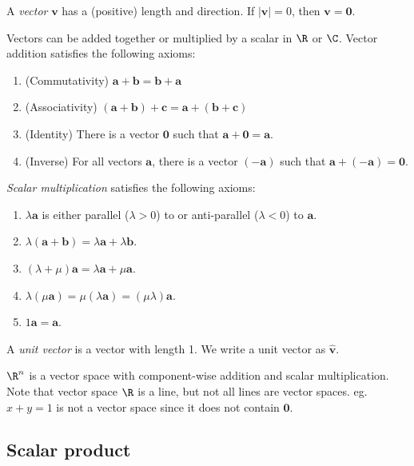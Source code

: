\documentclass[a4paper]{article}
\begin{document}
\begin{defi}[Vector]
  A \emph{vector} $\mathbf{v}$ has a (positive) length and direction.  If $|\mathbf{v}| = 0$, then $\mathbf{v} = \mathbf{0}$.

  Vectors can be added together or multiplied by a scalar in $\R$ or $\C$. Vector addition satisfies the following axioms:
  \begin{enumerate}
    \item (Commutativity) $\mathbf{a} + \mathbf{b} = \mathbf{b} + \mathbf{a}$
    \item (Associativity) $(\mathbf{a} + \mathbf{b}) + \mathbf{c} = \mathbf{a} + (\mathbf{b} + \mathbf{c})$
    \item (Identity) There is a vector $\mathbf{0}$ such that $\mathbf{a} + \mathbf{0} = \mathbf{a}$.
    \item (Inverse) For all vectors $\mathbf{a}$, there is a vector $(-\mathbf{a})$ such that $\mathbf{a} + (-\mathbf{a}) = \mathbf{0}$.
  \end{enumerate}
  \emph{Scalar multiplication} satisfies the following axioms:
  \begin{enumerate}
    \item $\lambda\mathbf{a}$ is either parallel ($\lambda > 0$) to or anti-parallel ($\lambda < 0$) to $\mathbf{a}$.
    \item $\lambda(\mathbf{a + b}) = \lambda\mathbf{a} + \lambda\mathbf{b}$.
    \item $(\lambda + \mu)\mathbf{a} = \lambda\mathbf{a} + \mu\mathbf{a}$.
    \item $\lambda(\mu\mathbf{a}) = \mu(\lambda\mathbf{a}) = (\mu\lambda)\mathbf{a}$.
    \item $1\mathbf{a = a}$.
  \end{enumerate}
\end{defi}

\begin{defi}
  A \emph{unit vector} is a vector with length 1. We write a unit vector as $\hat{\mathbf{v}}$.
\end{defi}

\begin{eg}
  $\R^n$ is a vector space with component-wise addition and scalar multiplication. Note that vector space $\R$ is a line, but not all lines are vector spaces. eg. $x + y = 1$ is not a vector space since it does not contain $\mathbf{0}$.
\end{eg}

\subsection{Scalar product}
\end{document}

